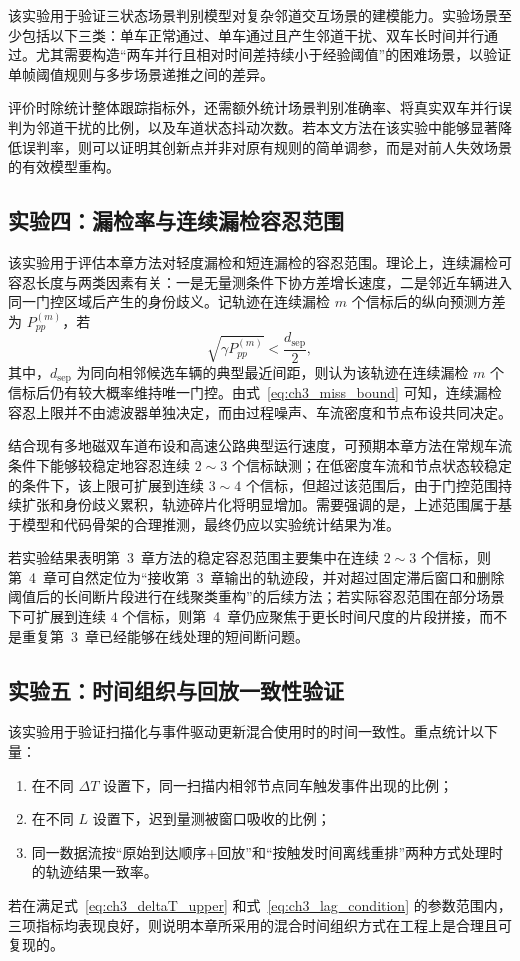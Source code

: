 \documentclass{xdupgthesis}
\begin{document}
该实验用于验证三状态场景判别模型对复杂邻道交互场景的建模能力。实验场景至少包括以下三类：单车正常通过、单车通过且产生邻道干扰、双车长时间并行通过。尤其需要构造“两车并行且相对时间差持续小于经验阈值”的困难场景，以验证单帧阈值规则与多步场景递推之间的差异。

评价时除统计整体跟踪指标外，还需额外统计场景判别准确率、将真实双车并行误判为邻道干扰的比例，以及车道状态抖动次数。若本文方法在该实验中能够显著降低误判率，则可以证明其创新点并非对原有规则的简单调参，而是对前人失效场景的有效模型重构。

\subsection{实验四：漏检率与连续漏检容忍范围}

该实验用于评估本章方法对轻度漏检和短连漏检的容忍范围。理论上，连续漏检可容忍长度与两类因素有关：一是无量测条件下协方差增长速度，二是邻近车辆进入同一门控区域后产生的身份歧义。记轨迹在连续漏检 $m$ 个信标后的纵向预测方差为 $P_{pp}^{(m)}$，若
\begin{equation}
	\sqrt{\gamma P_{pp}^{(m)}}<\frac{d_{\mathrm{sep}}}{2},
	\label{eq:ch3_miss_bound}
\end{equation}
其中，$d_{\mathrm{sep}}$ 为同向相邻候选车辆的典型最近间距，则认为该轨迹在连续漏检 $m$ 个信标后仍有较大概率维持唯一门控。由式~\eqref{eq:ch3_miss_bound} 可知，连续漏检容忍上限并不由滤波器单独决定，而由过程噪声、车流密度和节点布设共同决定。

结合现有多地磁双车道布设和高速公路典型运行速度，可预期本章方法在常规车流条件下能够较稳定地容忍连续 $2\sim 3$ 个信标缺测；在低密度车流和节点状态较稳定的条件下，该上限可扩展到连续 $3\sim 4$ 个信标，但超过该范围后，由于门控范围持续扩张和身份歧义累积，轨迹碎片化将明显增加。需要强调的是，上述范围属于基于模型和代码骨架的合理推测，最终仍应以实验统计结果为准。

若实验结果表明第~3~章方法的稳定容忍范围主要集中在连续 $2\sim3$ 个信标，则第~4~章可自然定位为“接收第~3~章输出的轨迹段，并对超过固定滞后窗口和删除阈值后的长间断片段进行在线聚类重构”的后续方法；若实际容忍范围在部分场景下可扩展到连续 $4$ 个信标，则第~4~章仍应聚焦于更长时间尺度的片段拼接，而不是重复第~3~章已经能够在线处理的短间断问题。

\subsection{实验五：时间组织与回放一致性验证}

该实验用于验证扫描化与事件驱动更新混合使用时的时间一致性。重点统计以下量：
\begin{enumerate}
	\item 在不同 $\Delta T$ 设置下，同一扫描内相邻节点同车触发事件出现的比例；
	\item 在不同 $L$ 设置下，迟到量测被窗口吸收的比例；
	\item 同一数据流按“原始到达顺序+回放”和“按触发时间离线重排”两种方式处理时的轨迹结果一致率。
\end{enumerate}
若在满足式~\eqref{eq:ch3_deltaT_upper} 和式~\eqref{eq:ch3_lag_condition} 的参数范围内，三项指标均表现良好，则说明本章所采用的混合时间组织方式在工程上是合理且可复现的。
\end{document}
